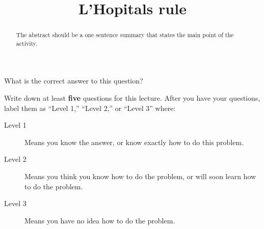 \documentclass{ximera}
\title{L'Hopitals rule}
\begin{document}
\begin{abstract}
  The abstract should be a one sentence summary that states the main point of the activity.
\end{abstract}

\maketitle

\begin{question}
  What is the correct answer to this question?

  
    \begin{multipleChoice}
    \end{multipleChoice}  
  
\end{question}

Write down at least \textbf{five} questions for this lecture. After
you have your questions, label them as ``Level 1,'' ``Level 2,'' or ``Level 3'' where:
\begin{description}
\item[Level 1] Means you know the answer, or know exactly how to do this problem.
\item[Level 2] Means you think you know how to do the problem, or will soon learn how to do the problem.
\item[Level 3] Means you have no idea how to do the problem. 
\end{description}
\begin{question}
  \begin{freeResponse}
  \end{freeResponse}
\end{question}
\end{document}
